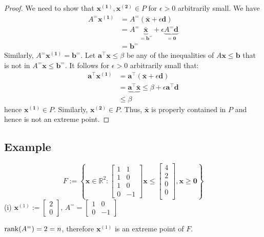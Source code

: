 \begin{proof}
We need to show that $ \bm{x^{(1)}},\bm{x^{(2)}}\in P $
for  $ \epsilon > 0 $ arbitrarily small. We have
\begin{align*}
    A^= \bm{x^{(1)}}&=A^=(\bm{\bar{x}} + \epsilon \bm{d})\\
    &=A^= \underbrace{\bm{\bar{x}}}_{=\bm{b^=}}
    +\epsilon\underbrace{A^= \bm{d}}_{=\bm{0}}\\
    &=\bm{b^=}
\end{align*}
Similarly, $ A^= \bm{x^{(1)}}= \bm{b^=}$. Let $ \bm{a}^\top \bm{x}\le \beta $
be any of the inequalities of $ A \bm{x}\le \bm{b} $ that is not in
$ A^= \bm{x}\le \bm{b}^= $. 
It follows for $ \epsilon >0 $ arbitrarily small that:
\begin{align*}
    \bm{a}^\top \bm{x^{(1)}}&= \bm{a}^\top(\bm{\bar{x}} + \epsilon \bm{d})\\
    &=\underbrace{\bm{a}^\top \bm{\bar{x}}}{\le \beta}+
    \epsilon \bm{a}^\top \bm{d}\\
    &\le \beta
\end{align*}
hence $ \bm{x^{(1)}}\in P $. Similarly, $ \bm{x^{(2)}}\in P $. Thus, 
$ \bm{\bar{x}} $ is properly contained in $ P $ and hence is not
an extreme point.
\end{proof}

\subsection{Example}
\[ F:=\left\{ \bm{x}\in\mathbb{R}^2: \begin{bmatrix}
    1 & 1\\
    1 & 0\\
    1 & 0\\
    0 & -1
\end{bmatrix}\bm{x}\le
\begin{bmatrix}
    4\\
    2\\
    0\\
    0\\
\end{bmatrix}, \bm{x}\ge \bm{0} \right\} \]
(i) 
$\bm{x}^{(1)}:=\begin{bmatrix}2\\0\end{bmatrix}$,
$ A^= =
\begin{bmatrix}
    1 & 0\\
    0 & -1
\end{bmatrix} $

$ \operatorname{rank}(A^=)=2=n $, therefore $\bm{x}^{(1)}$ is an extreme
point of $ F $.

